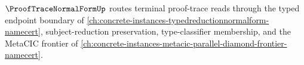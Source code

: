 $\ProofTraceNormalFormUp$ routes terminal proof-trace reads through the typed endpoint boundary of \autoref{ch:concrete-instances-typedreductionnormalform-namecert}, subject-reduction preservation, type-classifier membership, and the MetaCIC frontier of \autoref{ch:concrete-instances-metacic-parallel-diamond-frontier-namecert}.



